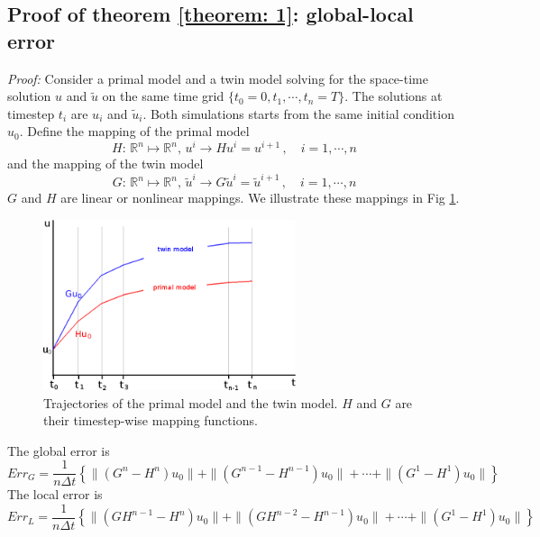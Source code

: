 \documentclass[a4paper,onecolumn]{article}
\theoremstyle{remark}
\begin{document}
    \subsection{Proof of theorem \ref{theorem: 1}: global-local error}
    \label{appendix 1}
    \emph{Proof:} Consider a primal model and a twin model solving
    for the space-time solution $u$ and $\tilde{u}$ on the same
    time grid $\{t_0=0,t_1,\cdots, t_n=T\}$. The solutions at timestep $t_i$
    are $u_i$ and $\tilde{u}_{i}$. Both simulations 
    starts from the same initial condition $u_0$. Define the mapping
    of the primal model 
    \begin{equation}
        H:\, \mathbb{R}^n\mapsto\mathbb{R}^n,\, u^i\rightarrow Hu^i = u^{i+1}\,,
        \quad i=1,\cdots, n
    \end{equation}
    and the mapping of the twin model
    \begin{equation}
        G:\, \mathbb{R}^n\mapsto\mathbb{R}^n,\, \tilde{u}^i\rightarrow 
        G\tilde{u}^i = \tilde{u}^{i+1}\,,\quad i=1,\cdots, n
    \end{equation}
    $G$ and $H$ are linear or nonlinear mappings.
    We illustrate these mappings in Fig \ref{fig:sketch}.
    \begin{figure}[H]\begin{center}
        \includegraphics[height=5cm]{sketch.png}
        \caption{Trajectories of the primal model and the twin model. 
                 $H$ and $G$ are their timestep-wise mapping functions.}
        \label{fig:sketch}
    \end{center}\end{figure}
    \noindent The global error is
    \begin{equation}
        Err_G = \frac{1}{n\Delta t}\left\{ \|(G^n - H^n) u_0\| + \|(G^{n-1}-H^{n-1})u_0\|
        +\cdots+\|(G^1-H^1)u_0\| \right\}
        \label{global error}
    \end{equation}
    The local error is
    \begin{equation}
        Err_L = \frac{1}{n\Delta t} \left\{
            \|\left(GH^{n-1} - H^{n}\right)u_0\| +  
            \|\left(GH^{n-2} - H^{n-1}\right)u_0\| + \cdots +
            \|\left(G^1-H^1\right)u_0\|
        \right\}
        \label{local error}
    \end{equation}
\end{document}
